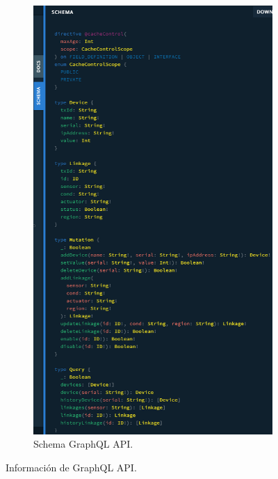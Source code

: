 \begin{figure}[hbtp!]
  \begin{subfigure}{0.5\textwidth}
    \includegraphics[width=\linewidth]{imagenes/desarrollo/web/api/graphql_schema}
    \caption{Schema GraphQL API.}
    \label{fig:graphql-schema}
  \end{subfigure}
  \caption{Información de GraphQL API.}
  \label{fig:info-graphql}
\end{figure}

\newpage

